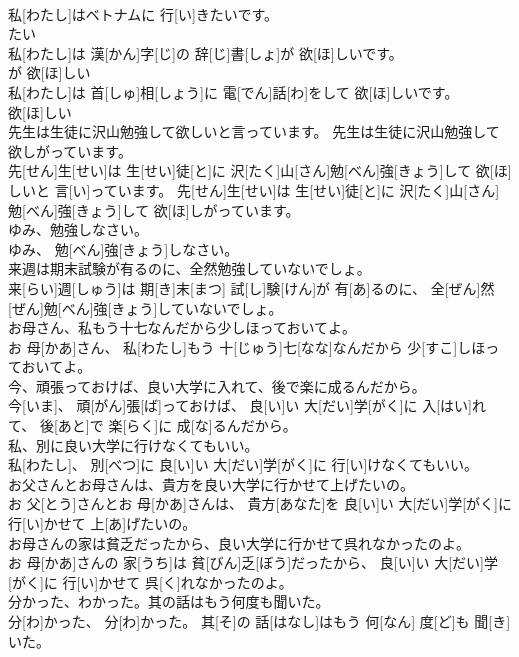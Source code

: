 \documentclass[8pt]{extreport}
\begin{document}
\begin{CJK}{UTF8}{min}
\\	私[わたし]はベトナムに 行[い]きたいです。 
\\	たい 
\\	私[わたし]は 漢[かん]字[じ]の 辞[じ]書[しょ]が 欲[ほ]しいです。 
\\	が 欲[ほ]しい 
\\	私[わたし]は 首[しゅ]相[しょう]に 電[でん]話[わ]をして 欲[ほ]しいです。 
\\	欲[ほ]しい 
\\	先生は生徒に沢山勉強して欲しいと言っています。 先生は生徒に沢山勉強して欲しがっています。	
\\	先[せん]生[せい]は 生[せい]徒[と]に 沢[たく]山[さん]勉[べん]強[きょう]して 欲[ほ]しいと 言[い]っています。 先[せん]生[せい]は 生[せい]徒[と]に 沢[たく]山[さん]勉[べん]強[きょう]して 欲[ほ]しがっています。
\\	ゆみ、勉強しなさい。	
\\	ゆみ、 勉[べん]強[きょう]しなさい。
\\	来週は期末試験が有るのに、全然勉強していないでしょ。	
\\	来[らい]週[しゅう]は 期[き]末[まつ] 試[し]験[けん]が 有[あ]るのに、 全[ぜん]然[ぜん]勉[べん]強[きょう]していないでしょ。
\\	お母さん、私もう十七なんだから少しほっておいてよ。	
\\	お 母[かあ]さん、 私[わたし]もう 十[じゅう]七[なな]なんだから 少[すこ]しほっておいてよ。
\\	今、頑張っておけば、良い大学に入れて、後で楽に成るんだから。	
\\	今[いま]、 頑[がん]張[ば]っておけば、 良[い]い 大[だい]学[がく]に 入[はい]れて、 後[あと]で 楽[らく]に 成[な]るんだから。
\\	私、別に良い大学に行けなくてもいい。	
\\	私[わたし]、 別[べつ]に 良[い]い 大[だい]学[がく]に 行[い]けなくてもいい。
\\	お父さんとお母さんは、貴方を良い大学に行かせて上げたいの。	
\\	お 父[とう]さんとお 母[かあ]さんは、 貴方[あなた]を 良[い]い 大[だい]学[がく]に 行[い]かせて 上[あ]げたいの。
\\	お母さんの家は貧乏だったから、良い大学に行かせて呉れなかったのよ。	
\\	お 母[かあ]さんの 家[うち]は 貧[びん]乏[ぼう]だったから、 良[い]い 大[だい]学[がく]に 行[い]かせて 呉[く]れなかったのよ。
\\	分かった、わかった。其の話はもう何度も聞いた。	
\\	分[わ]かった、 分[わ]かった。 其[そ]の 話[はなし]はもう 何[なん] 度[ど]も 聞[き]いた。

\end{CJK}
\end{document}
